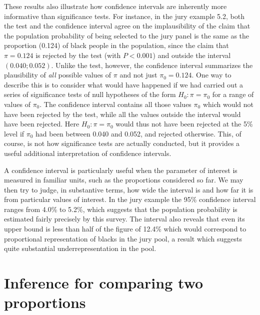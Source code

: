 \label{p_civstest}
These results also illustrate how confidence intervals are inherently
more informative than significance tests. For instance, in the jury
example 5.2, both the test and the confidence interval
agree on the implausibility of the claim that the population probability of being selected
to the jury panel is the same as the proportion (0.124) of black people
in the population, since the claim that $\pi=0.124$ is rejected
by the test (with $P<0.001$) and outside the interval $(0.040; 0.052)$.
Unlike the test, however, the confidence
interval summarizes the plausibility of \emph{all} possible values of
$\pi$ and not just $\pi_{0}=0.124$. One way to describe this is to consider what
would have happened if we had carried out a series of significance tests
of null hypotheses of the form $H_{0}: \pi=\pi_{0}$ for a range of
values of $\pi_{0}$.
The confidence interval
contains all those values $\pi_{0}$ which would not have been
rejected by the test, while all the values outside the interval would
have been rejected. Here $H_{0}: \pi=\pi_{0}$ would thus not have
been rejected at the 5\% level if $\pi_{0}$ had been between 0.040 and
0.052, and rejected otherwise. This, of course, is not how significance
tests are actually conducted, but it provides a useful additional
interpretation of confidence intervals.

A confidence interval is particularly useful when the parameter of
interest is measured in familiar units, such as the proportions
considered so far. We may then try to judge, in substantive terms,
how wide the interval is and how far it is from particular values of
interest. In the jury example the 95\% confidence interval ranges from
4.0\% to 5.2\%, which suggests that the population probability is
estimated fairly precisely by this survey. The interval also reveals
that even its upper bound is less than half of the figure of
12.4\% which would correspond to proportional representation of blacks
in the jury pool, a  result which suggests quite substantial
underrepresentation in the pool.

\section{Inference for comparing two proportions}
\label{s_probs_2samples}

